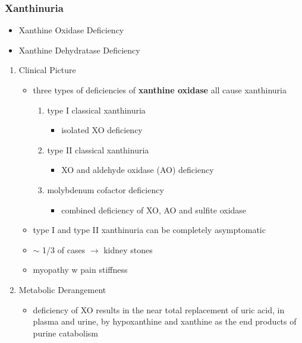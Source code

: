 \documentclass[12pt]{scrartcl}
\begin{document}
\subsubsection{Xanthinuria}
\label{sec:orgf599f17}
\begin{itemize}
\item Xanthine Oxidase Deficiency
\item Xanthine Dehydratase Deficiency
\end{itemize}
\begin{enumerate}
\item Clinical Picture
\label{sec:orgbedb9df}
\begin{itemize}
\item three types of deficiencies of \textbf{xanthine oxidase} all cause
xanthinuria
\begin{enumerate}
\item type I classical xanthinuria
\begin{itemize}
\item isolated XO deficiency
\end{itemize}
\item type II classical xanthinuria
\begin{itemize}
\item XO and aldehyde oxidase (AO) deficiency
\end{itemize}
\item molybdenum cofactor deficiency
\begin{itemize}
\item combined deficiency of XO, AO and sulfite oxidase
\end{itemize}
\end{enumerate}
\item type I and type II xanthinuria can be completely asymptomatic
\item \(\sim\) 1/3 of cases \(\to\) kidney stones
\item myopathy w pain stiffness
\end{itemize}

\item Metabolic Derangement
\label{sec:org9a55928}
\begin{itemize}
\item deficiency of XO results in the near total replacement of uric acid,
in plasma and urine, by hypoxanthine and xanthine as the end
products of purine catabolism
\end{itemize}



\end{enumerate}
\end{document}
